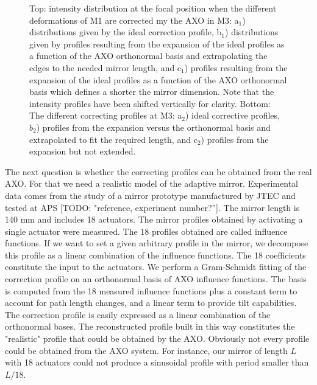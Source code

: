\documentclass[]{spie}  %
\newcommand{\todo}[1]{{\color{red}[TODO: "#1'']}}
\newcommand{\inred}[1]{{\color{red}#1}}
\begin{document}
\begin{figure} [ht]
\begin{center}
\begin{tabular}{l}
   \end{tabular}
   \end{center}
   \caption[example] 
   { \label{fig:intensitycorrected} 
Top: intensity distribution at the focal position when the different deformations of M1 are corrected my the AXO in M3: a$_1$) distributions given by the ideal correction profile, b$_1$) distributions given by profiles resulting from the expansion of the ideal profiles as a function of the AXO orthonormal basis and extrapolating the edges to the needed mirror length, and c$_1$)  profiles resulting from the expansion of the ideal profiles as a function of the AXO orthonormal basis which defines a shorter the mirror dimension. Note that the intensity profiles have been shifted vertically for clarity. Bottom: The different correcting profiles at M3: a$_2$) ideal corrective profiles, $b_2$) profiles from the expansion versus the orthonormal basis and extrapolated to fit the required length, and c$_2$) profiles from the expansion but not extended.}
   \end{figure} 


The next question is whether the correcting profiles can be obtained from the real AXO. For that we need a realistic model of the adaptive mirror.
Experimental data comes from the study of a mirror prototype manufactured by JTEC and tested at APS \todo{reference, experiment number?}. The mirror length is \inred{140 mm} and includes 18 actuators. The mirror profiles obtained by activating a single actuator were measured. The 18 profiles obtained are called influence functions. If we want to set a given arbitrary  profile in the mirror, we decompose this profile as a linear combination of the influence functions. The 18 coefficients constitute the input to the actuators.  
We perform a Gram-Schmidt fitting of the correction profile on an orthonormal basis of AXO influence functions. The basis is computed from the 18 measured influence functions plus a constant term to account for path length changes, and a linear term to provide tilt capabilities. The correction profile is easily expressed as a linear combination of the orthonormal bases. The reconstructed profile built in this way constitutes the "realistic" profile that could be obtained by the AXO. Obviously not every profile could be obtained from the AXO system. For instance, our mirror of length $L$ with 18 actuators could not produce a sinusoidal profile with period smaller than $L/18$. 
\end{document}
